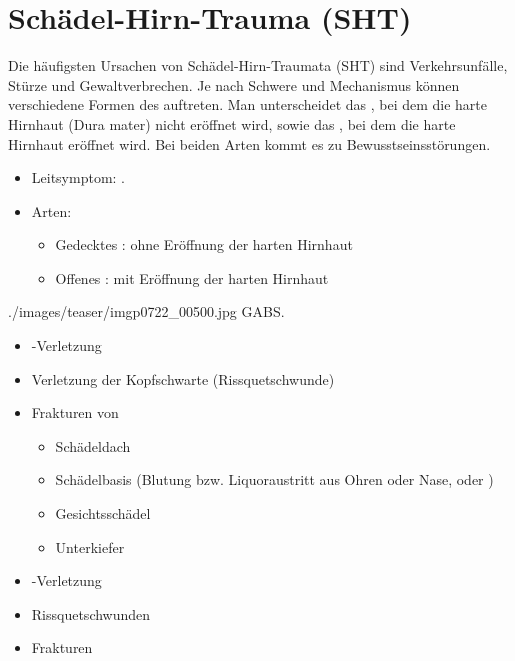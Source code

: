 \clearpage %
\section{Schädel-Hirn-Trauma (SHT)}
\label{topic:sht}



{%
Die häufigsten Ursachen von Schädel-Hirn-Traumata (SHT) sind
Verkehrsunfälle, Stürze und Gewaltverbrechen. Je nach
Schwere und Mechanismus können verschiedene  Formen des 
auftreten. Man unterscheidet das , bei dem
die harte Hirnhaut (Dura mater) nicht eröffnet wird, sowie
das , bei dem die harte Hirnhaut eröffnet
wird. Bei beiden Arten kommt es zu Bewusstseinsstörungen.


{\vspace{1cm}}

}{
\begin{itemize}
  \item Leitsymptom: .
  \item Arten:
  \begin{itemize}
    \item Gedecktes : ohne  Eröffnung der harten Hirnhaut
    \item Offenes : mit  Eröffnung der harten Hirnhaut
  \end{itemize}
\end{itemize}

}
{./images/teaser/imgp0722_00500.jpg}
{}
{GABS.}


{%
\begin{itemize}
  \item {}-Verletzung
  \item Verletzung der Kopfschwarte  (Rissquetschwunde)
  \item Frakturen von
  \begin{itemize}
    \item Schädeldach
    \item Schädelbasis (Blutung bzw. Liquoraustritt
    aus Ohren oder Nase, 
    oder )
    \item Gesichtsschädel
    \item Unterkiefer
  \end{itemize}
\end{itemize}
}{
\begin{itemize}
  \item {}-Verletzung
  \item Rissquetschwunden
  \item Frakturen
\end{itemize}
}{}{}{}




